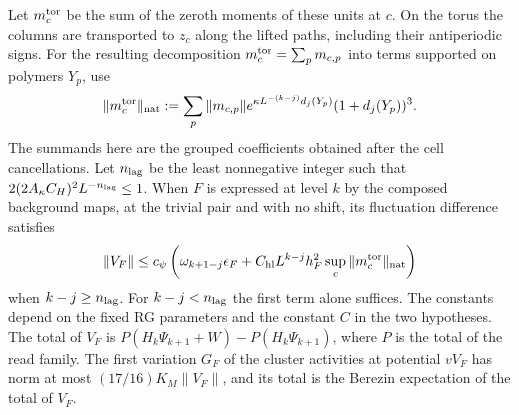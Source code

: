 \documentclass[11pt,letterpaper,reqno]{amsart}
\makeatletter
\theoremstyle{definition}
\newcommand{\ms@minorstart}{%
  \pushQED{\qed}\renewcommand{\qedsymbol}{$\blacksquare$}}
\newenvironment{lemma}[1][]{\ms@minorstart\ms@lemma[#1]}
  {\popQED\endms@lemma}
\theoremstyle{remark}
\makeatother
\begin{document}
\begin{lemma}
Let $m_c^{\rm tor}$ be the sum of the zeroth moments of
these units at $c$. On the torus the columns are transported
to $z_c$ along the lifted paths, including their
antiperiodic signs. For the resulting decomposition
$m_c^{\rm tor}=\sum_p m_{c,p}$ into terms supported on
polymers $Y_p$, use
\[
 \|m_c^{\rm tor}\|_{\rm nat}
 :=\sum_p\|m_{c,p}\|
 e^{\kappa L^{-(k-j)}d_j(Y_p)}(1+d_j(Y_p))^3.
\]
The summands here are the grouped coefficients obtained
after the cell cancellations.
Let $n_{\rm lag}$ be
the least nonnegative integer such that
$2(2A_\kappa C_H)^2L^{-n_{\rm lag}}\le1$.
When $F$ is expressed at level $k$ by the composed
background maps, at the trivial pair and with no shift,
its fluctuation difference satisfies
\begin{equation}\label{eq:qcdm2-old-representative}
 \|V_F\|\le c_\psi\left(
 \omega_{k+1-j}\epsilon_F+
 C_{\rm hl}L^{k-j}h_F^2
 \sup_c\|m_c^{\rm tor}\|_{\rm nat}\right)
\end{equation}
when $k-j\ge n_{\rm lag}$. For $k-j<n_{\rm lag}$ the first
term alone suffices. The constants depend on the fixed RG
parameters and the constant $C$ in the two hypotheses.
The total of $V_F$ is
$P(H_k\Psi_{k+1}+W)-P(H_k\Psi_{k+1})$, where $P$ is the
total of the read family.  The first variation $G_F$ of the
cluster activities at potential $vV_F$ has norm at most
$(17/16)K_M\|V_F\|$, and its total is the Berezin expectation
of the total of $V_F$.
\end{lemma}
\end{document}
